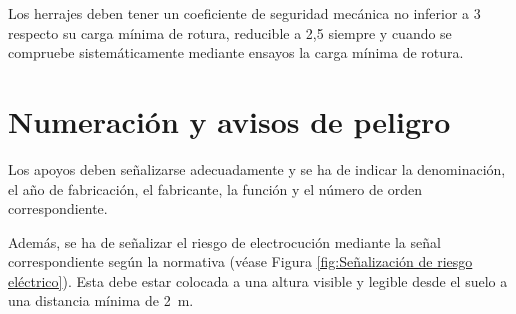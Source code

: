 Los herrajes deben tener un coeficiente de seguridad mecánica no inferior a 3 respecto su carga mínima de rotura, reducible a 2,5 siempre y cuando se compruebe sistemáticamente mediante ensayos la carga mínima de rotura.
\section{Numeración y avisos de peligro}
\label{sec:md-numeracion}
Los apoyos deben señalizarse adecuadamente y se ha de indicar la denominación, el año de fabricación, el fabricante, la función y el número de orden correspondiente.

Además, se ha de señalizar el riesgo de electrocución mediante la señal correspondiente según la normativa (véase Figura \ref{fig:Señalización de riesgo eléctrico}). Esta debe estar colocada a una altura visible y legible desde el suelo a una distancia mínima de \SI{2}{\meter}.

